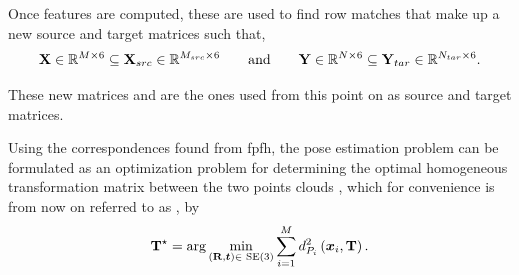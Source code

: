 
Once features are computed, these are used to find row matches that make up a new source and target matrices such that,
%
\begin{equation}
	\mat{X}\inR{M \times 6} \subseteq \mat{X}_{src}\inR{M_{src}\times 6} \qquad \text{and} \qquad \mat{Y}\inR{N \times 6} \subseteq \mat{Y}_{tar}\inR{N_{tar}\times 6}.
\end{equation}

These new matrices  and  are the ones used from this point on as source and target matrices. \medskip


Using the correspondences found from \gls{fpfh}, the pose estimation problem can be formulated as an optimization problem for determining the optimal homogeneous transformation matrix between the two points clouds , which for convenience is from now on referred to as \tf[T]{\star}{}, by
%
\begin{equation} \label{eq:point-cloud-registration-problem}
	\tf[T]{\star}{} = \arg \min_{(\mat{R},\vec{t})\in\SE (3)} \sum^M_{i=1} d_{P_i}^2\left( \vec{x}_i, \mat{T} \right).
\end{equation}

